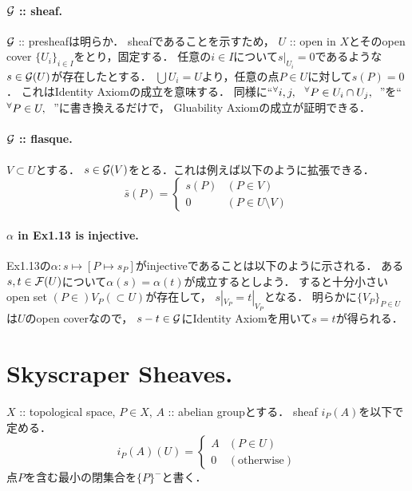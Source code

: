 \documentclass[a4paper]{jsarticle}
\begin{document}
    \paragraph{$\mathcal{G}$ :: sheaf.}
    $\mathcal{G}$ :: presheafは明らか．
    sheafであることを示すため，
    $U$ :: open in $X$とそのopen cover $\{U_i\}_{i \in I}$をとり，固定する．
    任意の$i \in I$について$s|_{U_i}=0$であるような$s \in \mathcal{G}(U)$が存在したとする．
    $\bigcup U_i=U$より，任意の点$P \in U$に対して$s(P)=0$．
    これはIdentity Axiomの成立を意味する．
    同様に``${}^{\forall} i,j,~~ {}^{\forall} P \in U_i \cap U_j,~~$''を``${}^{\forall} P \in U,~~$''に書き換えるだけで，
    Gluability Axiomの成立が証明できる．

    \paragraph{$\mathcal{G}$ :: flasque.}
    $V \subset U$とする．
    $s \in \mathcal{G}(V)$をとる．これは例えば以下のように拡張できる．
    \[
        \bar{s}(P)=
        \begin{cases}{}
            s(P) & (P \in V) \\
            0 & (P \in U \setminus V)
        \end{cases}
    \]

    \paragraph{$\alpha$ in Ex1.13 is injective.}
    Ex1.13の$\alpha: s \mapsto [P \mapsto s_P]$がinjectiveであることは以下のように示される．
    ある$s,t \in \mathcal{F}(U)$について$\alpha(s)=\alpha(t)$が成立するとしよう．
    すると十分小さいopen set $(P \in) V_P (\subset U)$が存在して，
    $s|_{V_P}=t|_{V_P}$となる．
    明らかに$\{V_P\}_{P \in U}$は$U$のopen coverなので，
    $s-t \in \mathcal{G}$にIdentity Axiomを用いて$s=t$が得られる．

\section{Skyscraper Sheaves.} %
    $X$ :: topological space, $P \in X$, $A$ :: abelian groupとする．
    sheaf $i_P(A)$を以下で定める．
    \[
        i_P(A)(U)=
        \begin{cases}{}
            A & (P \in U) \\
            0 & (\text{otherwise})
        \end{cases}
    \]
    点$P$を含む最小の閉集合を$\{P\}^-$と書く．
\end{document}
